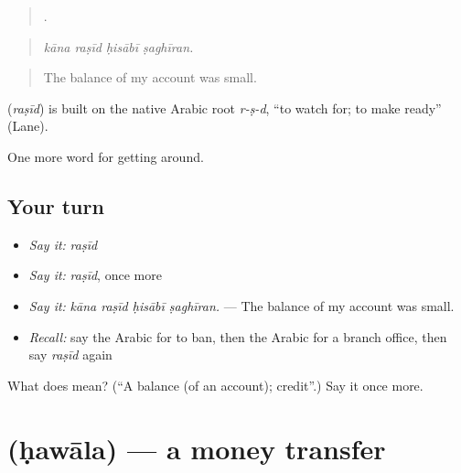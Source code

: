 \begin{quote}
   .
\end{quote}

\begin{quote}
\emph{kāna raṣīd ḥisābī ṣaghīran.}
\end{quote}

\begin{quote}
The balance of my account was small.
\end{quote}

\begin{cousinweb}
\textbf{} (\emph{raṣīd}) is built on the native Arabic root \emph{r-ṣ-d}, \textquotedblleft{}to watch for; to make ready\textquotedblright{} (Lane).
\end{cousinweb}

\begin{grammarlens}[title={What you've built}]
One more word for getting around.
\end{grammarlens}

\subsection*{Your turn}
\begin{itemize}
\raggedright
  \item \emph{Say it:} \emph{raṣīd}
  \item \emph{Say it:} \emph{raṣīd}, once more
  \item \emph{Say it:} \emph{kāna raṣīd ḥisābī ṣaghīran.} — The balance of my account was small.
  \item \emph{Recall:} say the Arabic for to ban, then the Arabic for a branch office, then say \emph{raṣīd} again
\end{itemize}

\begin{tcolorbox}[breakable,colback=teal!4,colframe=teal!35!black,title={Before you move on}]
What does  mean? (\textquotedblleft{}A balance (of an account); credit\textquotedblright{}.) Say it once more.
\end{tcolorbox}
\section[\texorpdfstring{\ar{حوالة} (ḥawāla)}{حوالة (ḥawāla)}]{ (ḥawāla) — a money transfer}

\label{lesson:AR-C452-hawala}



